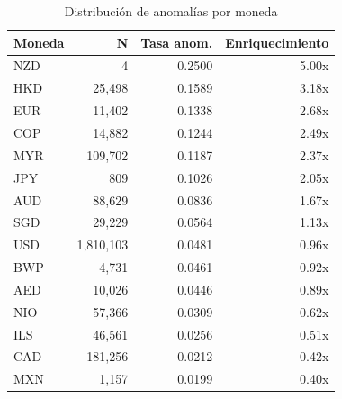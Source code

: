 \begin{table}[htbp]
\centering
\small
\caption{Distribución de anomalías por moneda}
\label{tab:posthoc-currency}
\begin{tabular}{lrrr}
\toprule
Moneda & N & Tasa anom. & Enriquecimiento \\
\midrule
  NZD & 4 & 0.2500 & 5.00x \\
  HKD & 25,498 & 0.1589 & 3.18x \\
  EUR & 11,402 & 0.1338 & 2.68x \\
  COP & 14,882 & 0.1244 & 2.49x \\
  MYR & 109,702 & 0.1187 & 2.37x \\
  JPY & 809 & 0.1026 & 2.05x \\
  AUD & 88,629 & 0.0836 & 1.67x \\
  SGD & 29,229 & 0.0564 & 1.13x \\
  USD & 1,810,103 & 0.0481 & 0.96x \\
  BWP & 4,731 & 0.0461 & 0.92x \\
  AED & 10,026 & 0.0446 & 0.89x \\
  NIO & 57,366 & 0.0309 & 0.62x \\
  ILS & 46,561 & 0.0256 & 0.51x \\
  CAD & 181,256 & 0.0212 & 0.42x \\
  MXN & 1,157 & 0.0199 & 0.40x \\
\bottomrule
\end{tabular}
\end{table}
